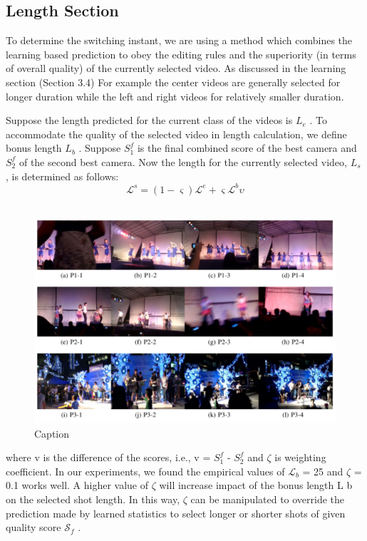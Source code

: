 \documentclass[conference]{IEEEtran}
\begin{document}
\subsection{Length Section}
To determine the switching instant, we are using a method which
combines the learning based prediction to obey the editing rules and
the superiority (in terms of overall quality) of the currently selected
video. As discussed in the learning section (Section 3.4) For example the
center videos are generally selected for longer duration while the
left and right videos for relatively smaller duration.

Suppose the length predicted for the current class of the videos
is $L_e$ . To accommodate the quality of the selected video in length
calculation, we define bonus length $L_b$ . Suppose $S^{f}_1$ is the final combined score of the best camera and $S^{f}_2$
of the second best camera. Now the length for the currently selected
video, $L_s$ , is determined as follows:
\begin{equation}
\mathcal{L}^s = (1-\varsigma)\mathcal{L}^e+\varsigma \mathcal{L}^b\upsilon
\end{equation}
\\
\begin{figure}
    \centering
    \includegraphics{img6.png}
    \caption{Caption}
    \label{fig:my_label}
\end{figure}
where v is the difference of the scores, i.e., v = ${S^{f}_1}$ - ${S^{f}_2}$ and $\zeta$ is
weighting coefficient. In our experiments, we found the empirical
values of $\mathcal{L}_b$ = 25 and $\zeta$ = 0.1 works well. A higher value of
$\zeta$ will increase impact of the bonus length L b on the selected shot
length. In this way, $\zeta$ can be manipulated to override the prediction
made by learned statistics to select longer or shorter shots of given
quality score $\mathcal{S}_f$ .
\end{document}
